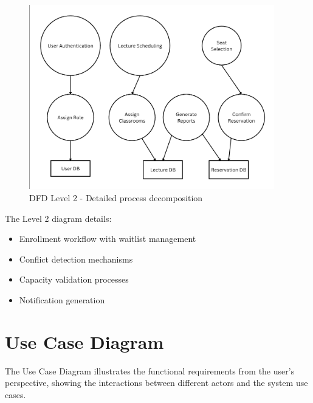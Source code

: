 \begin{figure}[h]
    \centering
    \includegraphics[width=0.95\textwidth]{images/DFD Level 2.png}
    \caption{DFD Level 2 - Detailed process decomposition}
    \label{fig:dfd2}
\end{figure}

The Level 2 diagram details:
\begin{itemize}[leftmargin=*]
    \item Enrollment workflow with waitlist management
    \item Conflict detection mechanisms
    \item Capacity validation processes
    \item Notification generation
\end{itemize}

\section{Use Case Diagram}

The Use Case Diagram illustrates the functional requirements from the user's perspective, showing the interactions between different actors and the system use cases.

